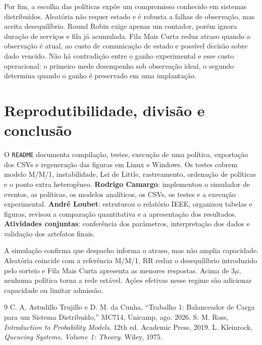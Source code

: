 \documentclass[conference]{IEEEtran}
\begin{document}
Por fim, a escolha das políticas expõe um compromisso conhecido em sistemas distribuídos. Aleatória não requer estado e é robusta a falhas de observação, mas aceita desequilíbrio. Round Robin exige apenas um contador, porém ignora duração de serviços e fila já acumulada. Fila Mais Curta reduz atraso quando a observação é atual, ao custo de comunicação de estado e possível decisão sobre dado vencido. Não há contradição entre o ganho experimental e esse custo operacional: o primeiro mede desempenho sob observação ideal, o segundo determina quando o ganho é preservado em uma implantação.

\section{Reprodutibilidade, divisão e conclusão}
O \texttt{README} documenta compilação, testes, execução de uma política, exportação dos CSVs e regeneração das figuras em Linux e Windows. Os testes cobrem modelo M/M/1, instabilidade, Lei de Little, rastreamento, ordenação de políticas e o ponto extra heterogêneo. \textbf{Rodrigo Camargo}: implementou o simulador de eventos, as políticas, os modelos analíticos, os CSVs, os testes e a execução experimental. \textbf{André Loubet}: estruturou o relatório IEEE, organizou tabelas e figuras, revisou a comparação quantitativa e a apresentação dos resultados. \textbf{Atividades conjuntas}: conferência dos parâmetros, interpretação dos dados e validação dos artefatos finais.

A simulação confirma que despacho informa o atraso, mas não amplia capacidade. Aleatória coincide com a referência M/M/1, RR reduz o desequilíbrio introduzido pelo sorteio e Fila Mais Curta apresenta as menores respostas. Acima de $3\mu$, nenhuma política torna a rede estável. Ações efetivas nesse regime são adicionar capacidade ou limitar admissão.

\begin{thebibliography}{9}
C. A. Astudillo Trujillo e D. M. da Cunha, ``Trabalho 1: Balanceador de Carga para um Sistema Distribuído,'' MC714, Unicamp, ago. 2026.
S. M. Ross, \textit{Introduction to Probability Models}, 12th ed. Academic Press, 2019.
L. Kleinrock, \textit{Queueing Systems, Volume 1: Theory}. Wiley, 1975.
\end{thebibliography}
\end{document}
